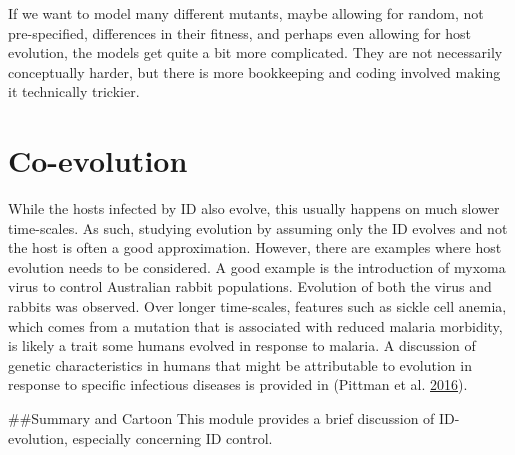 \documentclass[]{book}
\theoremstyle{definition}
\theoremstyle{definition}
\theoremstyle{definition}
\theoremstyle{remark}
\begin{document}
If we want to model many different mutants, maybe allowing for random,
not pre-specified, differences in their fitness, and perhaps even
allowing for host evolution, the models get quite a bit more
complicated. They are not necessarily conceptually harder, but there is
more bookkeeping and coding involved making it technically trickier.

\hypertarget{co-evolution}{%
\section{Co-evolution}\label{co-evolution}}

While the hosts infected by ID also evolve, this usually happens on much
slower time-scales. As such, studying evolution by assuming only the ID
evolves and not the host is often a good approximation. However, there
are examples where host evolution needs to be considered. A good example
is the introduction of myxoma virus to control Australian rabbit
populations. Evolution of both the virus and rabbits was observed. Over
longer time-scales, features such as sickle cell anemia, which comes
from a mutation that is associated with reduced malaria morbidity, is
likely a trait some humans evolved in response to malaria. A discussion
of genetic characteristics in humans that might be attributable to
evolution in response to specific infectious diseases is provided in
(Pittman et al. \protect\hyperlink{ref-pittman16}{2016}).

\#\#Summary and Cartoon This module provides a brief discussion of
ID-evolution, especially concerning ID control.
\end{document}
